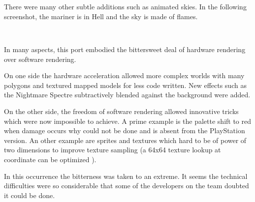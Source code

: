 \\

\\
\par


There were many other subtle additions such as animated skies. In the following screenshot, the mariner is in Hell and the sky is made of flames.\\
\par
{}\\
\par
In many aspects, this port embodied the bittersweet deal of hardware rendering over software rendering.\\
\par
On one side the hardware acceleration allowed more complex worlds with many polygons and textured mapped models for less code written. New effects such as the Nightmare Spectre subtractively blended against the background were added.\\
\par
 On the other side, the freedom of software rendering allowed innovative tricks which were now impossible to achieve. A prime example is the palette shift to red when damage occurs why could not be done and is absent from the PlayStation version. An other example are sprites and textures which hard to be of power of two dimensions to improve texture sampling (a 64x64 texture lookup at coordinate  can be optimized ).\\
\par
In this occurrence the bitterness was taken to an extreme. It seems the technical difficulties were so considerable that some of the developers on the team doubted it could be done.


